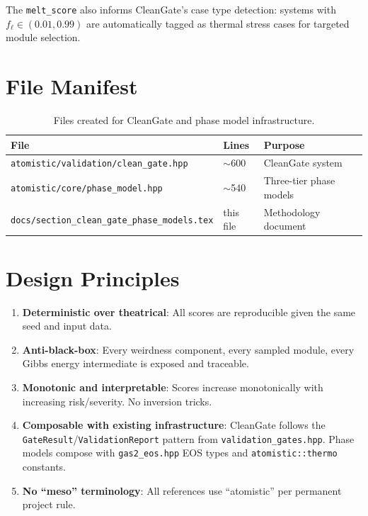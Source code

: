 \documentclass[11pt,a4paper]{article}
\begin{document}
The \texttt{melt\_score} also informs CleanGate's case type detection:
systems with $f_\ell \in (0.01, 0.99)$ are automatically tagged as
thermal stress cases for targeted module selection.

\section{File Manifest}

\begin{table}[h]
\centering
\begin{tabular}{lll}
\toprule
\textbf{File} & \textbf{Lines} & \textbf{Purpose} \\
\midrule
\texttt{atomistic/validation/clean\_gate.hpp}  & $\sim$600 & CleanGate system \\
\texttt{atomistic/core/phase\_model.hpp}       & $\sim$540 & Three-tier phase models \\
\texttt{docs/section\_clean\_gate\_phase\_models.tex} & this file & Methodology document \\
\bottomrule
\end{tabular}
\caption{Files created for CleanGate and phase model infrastructure.}
\end{table}

\section{Design Principles}

\begin{enumerate}
  \item \textbf{Deterministic over theatrical}: All scores are reproducible
        given the same seed and input data.
  \item \textbf{Anti-black-box}: Every weirdness component, every sampled
        module, every Gibbs energy intermediate is exposed and traceable.
  \item \textbf{Monotonic and interpretable}: Scores increase monotonically
        with increasing risk/severity. No inversion tricks.
  \item \textbf{Composable with existing infrastructure}: CleanGate follows
        the \texttt{GateResult}/\texttt{ValidationReport} pattern from
        \texttt{validation\_gates.hpp}. Phase models compose with
        \texttt{gas2\_eos.hpp} EOS types and \texttt{atomistic::thermo}
        constants.
  \item \textbf{No ``meso'' terminology}: All references use ``atomistic''
        per permanent project rule.
\end{enumerate}
\end{document}
